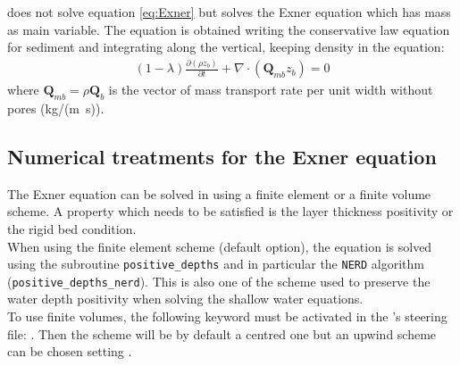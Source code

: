 \gaia{} does not solve equation \eqref{eq:Exner} but solves the Exner equation which has mass as main variable. The equation is obtained writing the conservative law equation for sediment and integrating along the vertical, keeping density in the equation:
\begin{align}
(1-\lambda)\frac{\partial \left(\rho z_b\right)}{\partial t} + \nabla\cdot \left(\mathbf Q_{mb} z_b\right) = 0
\label{eq:Exner_mass}
\end{align}
where $\mathbf Q_{mb}=\rho \mathbf Q_b$ is the vector of mass transport rate per unit width without pores (kg/(m~s)).

\subsection{Numerical treatments for the Exner equation}
The Exner equation can be solved in \gaia{} using a finite element or a finite volume scheme. A property which needs to be satisfied is the layer thickness positivity or the rigid bed condition. \\
When using the finite element scheme (default option), the equation is solved using the subroutine \texttt{positive\_depths} and in particular the \texttt{NERD} algorithm (\texttt{positive\_depths\_nerd}). This is also one of the scheme used to preserve the water depth positivity when solving the shallow water equations. \\
To use finite volumes, the following keyword must be activated in the \gaia{}'s steering file: . Then the scheme will be by default a centred one but an upwind scheme can be chosen setting .
